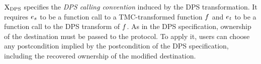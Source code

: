 $\mathrm{X}_\mathrm{DPS}$ specifies the \emph{DPS calling convention} induced by the DPS transformation.
It requires $\datalangExpr_s$ to be a function call to a TMC-transformed function $\datalangFn$ and $\datalangExpr_t$ to be a function call to the DPS transform of $\datalangFn$.
As in the DPS specification, ownership of the destination must be passed to the protocol.
To apply it, users can choose any postcondition implied by the postcondition of the DPS specification, including the recovered ownership of the modified destination.


